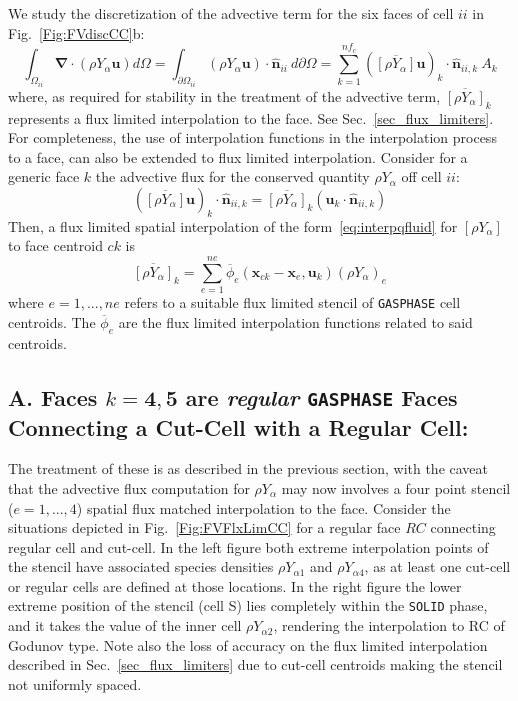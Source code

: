 We study the discretization of the advective term for the six faces of cell $ii$ in Fig.~\ref{Fig:FVdiscCC}b:
%
\begin{equation}
  \int_{\Omega_{ii}} { \boldsymbol{\nabla} \cdot  \left(  \rho Y_\alpha \mathbf{u} \right) } d \Omega =
  \int_{\partial \Omega_{ii}} { \left( \rho Y_\alpha \mathbf{u} \right) \cdot \hat{\mathbf{n}}_{ii} } \: d \partial \Omega =
  \sum^{nf_c}_{k=1} \left(  \overline{[\rho Y_\alpha]} \mathbf{u} \right)_k \cdot \hat{\mathbf{n}}_{ii,k} \: A_k \label{eq:fvadv}
\end{equation}
%
where, as required for stability in the treatment of the advective term, $\overline{[\rho Y_\alpha]}_k$ represents a flux limited interpolation to the face. See Sec.~\ref{sec_flux_limiters}. For completeness, the use of interpolation functions in the interpolation process to a face, can also be extended to flux limited interpolation. Consider for a generic face $k$ the advective flux for the conserved quantity $\rho Y_\alpha$ off cell $ii$:
%
\begin{equation}   
    \left(  \overline{[\rho Y_\alpha]} \mathbf{u} \right)_k \cdot \hat{\mathbf{n}}_{ii,k}  = \overline{[\rho Y_\alpha]}_k \left(  \mathbf{u}_k \cdot \hat{\mathbf{n}}_{ii,k} \right) 
\end{equation}
%
Then, a flux limited spatial interpolation of the form~\eqref{eq:interpqfluid} for $[\rho Y_\alpha]$ to face centroid $ck$ is
%
\begin{equation}
  \overline{[\rho Y_\alpha]}_k = \sum^{ne}_{e=1} \overline{\phi}_e(\mathbf{x}_{ck}-\mathbf{x}_e, \mathbf{u}_k) \left( \rho Y_{\alpha} \right)_e
\end{equation}
%
where $e=1,...,ne$ refers to a suitable flux limited stencil of \texttt{GASPHASE} cell centroids. The $\overline{\phi}_e$ are the flux limited interpolation functions  related to said centroids.

\subsection*{A. Faces $k=\mathbf{4},\mathbf{5}$ are \textit{regular} \texttt{GASPHASE} Faces Connecting a Cut-Cell with a Regular Cell:}
The treatment of these is as described in the previous section, with the caveat that the advective flux computation for $\rho Y_\alpha$ may now involves a four point stencil ($e=1,...,4$) spatial flux matched interpolation to the face. Consider the situations depicted in Fig.~\ref{Fig:FVFlxLimCC} for a regular face $RC$ connecting regular cell and cut-cell. In the left figure both extreme interpolation points of the stencil have associated species densities $\rho Y_{\alpha 1}$ and $\rho Y_{\alpha 4}$, as at least one cut-cell or regular cells are defined at those locations. In the right figure the lower extreme position of the stencil (cell S) lies completely within the \texttt{SOLID} phase, and it takes the value of the inner cell $\rho Y_{\alpha 2}$, rendering the interpolation to RC of Godunov type. Note also the loss of accuracy on the flux limited interpolation described in Sec.~\ref{sec_flux_limiters} due to cut-cell centroids making the stencil not uniformly spaced.
 
